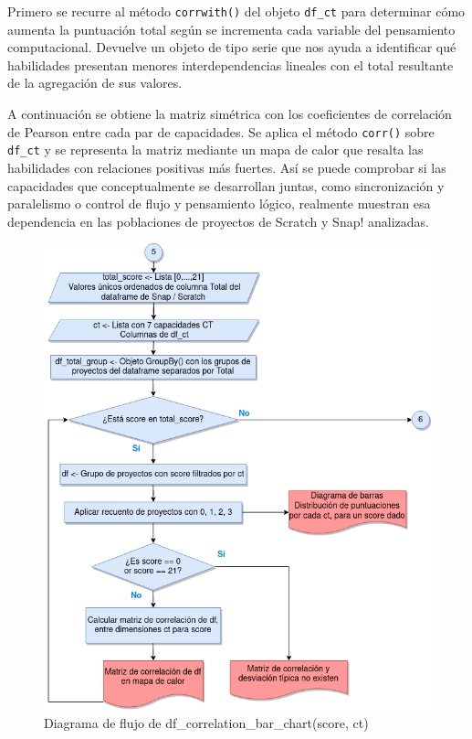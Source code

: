 \documentclass[a4paper, 12pt]{book}
\begin{document}
Primero se recurre al método \texttt{corrwith()} del objeto \texttt{df\_ct} para determinar cómo aumenta la puntuación total según se incrementa cada variable del pensamiento computacional. Devuelve un objeto de tipo serie que nos ayuda a identificar qué habilidades presentan menores interdependencias lineales con el total resultante de la agregación de sus valores.

A continuación se obtiene la matriz simétrica con los coeficientes de correlación de Pearson entre cada par de capacidades. Se aplica el método \texttt{corr()} sobre \texttt{df\_ct} y se representa la matriz mediante un mapa de calor que resalta las habilidades con relaciones positivas más fuertes. Así se puede comprobar si las capacidades que conceptualmente se desarrollan juntas, como sincronización y paralelismo o control de flujo y pensamiento lógico, realmente muestran esa dependencia en las poblaciones de  proyectos de Scratch y Snap! analizadas.

\begin{figure}[H]
    \centering
    \includegraphics[height=.5\textheight]{img/diagrama_corr2.png}
    \caption{Diagrama de flujo de df\_correlation\_bar\_chart(score, ct)}\label{fig:diagrama_corr}
\end{figure}
\end{document}
